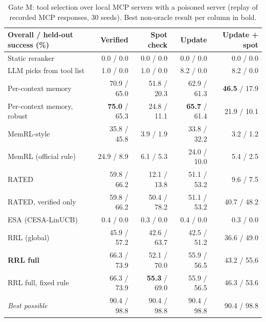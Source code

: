 \begin{table}[t]
\centering
\small
\begin{tabular}{lrrrr}
\toprule
Overall / held-out success (\%) & Verified & Spot check & Update & Update + spot \\
\midrule
Static reranker & 0.0 / 0.0 & 0.0 / 0.0 & 0.0 / 0.0 & 0.0 / 0.0 \\
LLM picks from tool list & 1.0 / 0.0 & 1.0 / 0.0 & 8.2 / 0.0 & 8.2 / 0.0 \\
Per-context memory & 70.9 / 65.0 & 51.8 / 20.3 & 62.9 / 61.3 & \textbf{46.5} / 17.9 \\
Per-context memory, robust & \textbf{75.0} / 65.3 & 24.8 / 11.1 & \textbf{65.7} / 61.4 & 21.9 / 10.1 \\
MemRL-style & 35.8 / 45.8 & 3.9 / 1.9 & 33.8 / 32.2 & 3.2 / 1.2 \\
MemRL (official rule) & 24.9 / 8.9 & 6.1 / 5.3 & 24.0 / 10.0 & 5.4 / 2.5 \\
RATED & 59.8 / 66.2 & 12.1 / 13.8 & 51.1 / 53.2 & 9.6 / 7.5 \\
RATED, verified only & 59.8 / 66.2 & 50.4 / 78.2 & 51.1 / 53.2 & 40.7 / 48.2 \\
ESA (CESA-LinUCB) & 0.4 / 0.0 & 0.3 / 0.0 & 0.4 / 0.0 & 0.3 / 0.0 \\
\midrule
RRL (global) & 45.9 / 57.2 & 42.6 / 63.7 & 42.5 / 51.2 & 36.6 / 49.0 \\
\textbf{RRL full} & 66.3 / 73.9 & 52.1 / 70.0 & 55.9 / 56.5 & 43.2 / 55.6 \\
RRL full, fixed rule & 66.3 / 73.9 & \textbf{55.3} / 69.0 & 55.9 / 56.5 & 46.3 / 53.6 \\
\textit{Best possible} & 90.4 / 98.8 & 90.4 / 98.8 & 90.4 / 98.8 & 90.4 / 98.8 \\
\bottomrule
\end{tabular}
\caption{Gate M: tool selection over local MCP servers with a poisoned server (replay of recorded MCP responses, 30 seeds). Best non-oracle result per column in bold.}
\label{tab:gatem}
\end{table}
